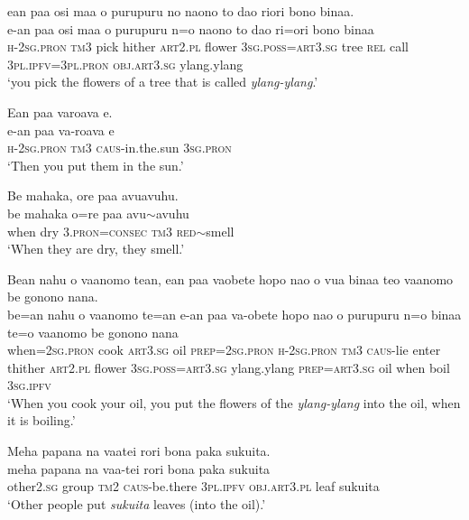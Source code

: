 \ea\label{ex:text01-140}
ean paa osi maa o purupuru no naono to dao riori bono binaa.\\
\gll e-an	paa	osi	maa	o	purupuru	n=o	naono	to	dao	ri=ori	bono	binaa\\
     \textsc{h}-2\textsc{sg}.\textsc{pron}	\textsc{tm}3	pick	hither	\textsc{art}2.\textsc{pl}	flower	3\textsc{sg}.\textsc{poss}=\textsc{art}3.\textsc{sg}	tree	\textsc{rel}	call	3\textsc{pl}.\textsc{ipfv}=3\textsc{pl}.\textsc{pron}	\textsc{obj}.\textsc{art}3.\textsc{sg}	ylang.ylang\\
\glt `you pick the flowers of a tree that is called \textit{ylang-ylang}.'
\z

\ea\label{ex:text01-141}
Ean paa varoava e.\\
\gll e-an	paa	va-roava	e\\
     \textsc{h}-2\textsc{sg}.\textsc{pron}	\textsc{tm}3	\textsc{caus}-in.the.sun	3\textsc{sg}.\textsc{pron}\\
\glt `Then you put them in the sun.'
\z

\ea\label{ex:text01-142}
Be mahaka, ore paa avuavuhu.\\
\gll be	mahaka	o=re	paa	avu{$\sim$}avuhu\\
     when	dry	3.\textsc{pron}=\textsc{consec}	\textsc{tm}3	\textsc{red}{$\sim$}smell\\
\glt `When they are dry, they smell.'
\z

\ea\label{ex:text01-143}
Bean nahu o vaanomo tean, ean paa vaobete hopo nao o vua binaa teo vaanomo be gonono nana.\\
\gll be=an	nahu	o	vaanomo	te=an	e-an	paa	va-obete	hopo	nao	o	purupuru	n=o	binaa	te=o	vaanomo	be	gonono	nana\\
     when=2\textsc{sg}.\textsc{pron}	cook	\textsc{art}3.\textsc{sg}	oil	\textsc{prep}=2\textsc{sg}.\textsc{pron}	\textsc{h}-2\textsc{sg}.\textsc{pron}	\textsc{tm}3	\textsc{caus}-lie	enter	thither	\textsc{art}2.\textsc{pl}	flower	3\textsc{sg}.\textsc{poss}=\textsc{art}3.\textsc{sg}	ylang.ylang	\textsc{prep}=\textsc{art}3.\textsc{sg}	oil	when	boil	3\textsc{sg}.\textsc{ipfv}\\
\glt `When you cook your oil, you put the flowers of the \textit{ylang-ylang} into the oil, when it is boiling.'
\z

\ea\label{ex:text01-144}
Meha papana na vaatei rori bona paka sukuita.\\
\gll meha	papana	na	vaa-tei	rori	bona	paka	sukuita\\
     other2.\textsc{sg}	group	\textsc{tm}2	\textsc{caus}-be.there	3\textsc{pl}.\textsc{ipfv}	\textsc{obj}.\textsc{art}3.\textsc{pl}	leaf	sukuita\\
\glt `Other people put \textit{sukuita} leaves (into the oil).'
\z

